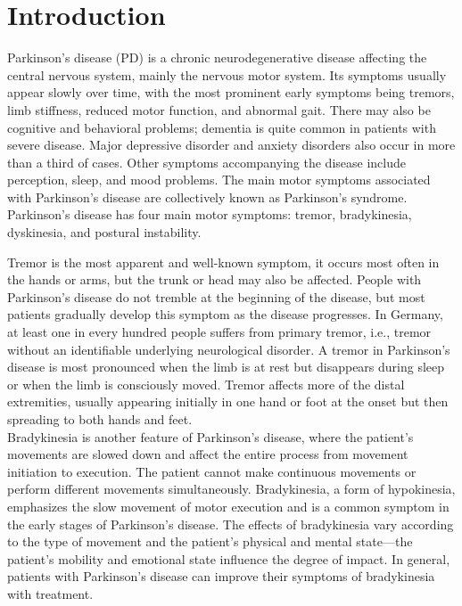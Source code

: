 \chapter{Introduction}
\label{sec:introduction}

Parkinson's disease (PD) is a chronic neurodegenerative disease affecting the central nervous system, mainly the nervous motor system.\cite{NIND} Its symptoms usually appear slowly over time, with the most prominent early symptoms being tremors, limb stiffness, reduced motor function, and abnormal gait. There may also be cognitive and behavioral problems; dementia is quite common in patients with severe disease. Major depressive disorder and anxiety disorders also occur in more than a third of cases. Other symptoms accompanying the disease include perception, sleep, and mood problems. The main motor symptoms associated with Parkinson's disease are collectively known as Parkinson's syndrome. Parkinson's disease has four main motor symptoms: tremor, bradykinesia, dyskinesia, and postural instability. \\ \cite{NIND,SAMII20041783}

Tremor is the most apparent and well-known symptom, it occurs most often in the hands or arms, but the trunk or head may also be affected. People with Parkinson's disease do not tremble at the beginning of the disease, but most patients gradually develop this symptom as the disease progresses. In Germany, at least one in every hundred people suffers from primary tremor, i.e., tremor without an identifiable underlying neurological disorder.\cite{Klinik} A tremor in Parkinson's disease is most pronounced when the limb is at rest but disappears during sleep or when the limb is consciously moved. Tremor affects more of the distal extremities, usually appearing initially in one hand or foot at the onset but then spreading to both hands and feet. \\

Bradykinesia is another feature of Parkinson's disease, where the patient's movements are slowed down and affect the entire process from movement initiation to execution. The patient cannot make continuous movements or perform different movements simultaneously. \cite{SAMII20041783} Bradykinesia, a form of hypokinesia, emphasizes the slow movement of motor execution and is a common symptom in the early stages of Parkinson's disease. The effects of bradykinesia vary according to the type of movement and the patient's physical and mental state—the patient's mobility and emotional state influence the degree of impact. In general, patients with Parkinson's disease can improve their symptoms of bradykinesia with treatment.\\

